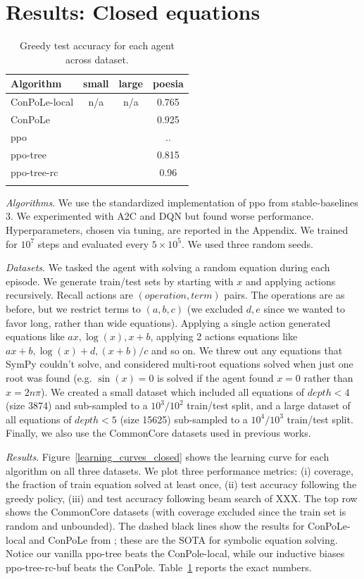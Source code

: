 \documentclass{article}
\theoremstyle{plain}
\theoremstyle{definition}
\theoremstyle{remark}
\begin{document}
\section{Results: Closed equations}
\begin{table}[t!]
\centering
\footnotesize
\caption{Greedy test accuracy for each agent across dataset.}
\begin{tabular}{l c c c}
\toprule
Algorithm & small & large & poesia \\
\midrule
ConPoLe-local     & n/a  & n/a  & 0.765  \\
ConPoLe          &  &  & 0.925  \\
ppo          &  &  & ..  \\
ppo-tree     &  &  & 0.815  \\
ppo-tree-rc  &  &  & 0.96  \\
\bottomrule
\label{tab:test_greedy}
\end{tabular}
\end{table}

\textit{Algorithms}. We use the standardized implementation of ppo from stable-baselines 3. We experimented with A2C and DQN but found worse performance. Hyperparameters, chosen via tuning, are reported in the Appendix. We trained for $10^7$ steps and evaluated every $5 \times 10^5$. We used three random seeds. 

\textit{Datasets}. We tasked the agent with solving a random equation during each episode. We generate train/test sets by starting with $x$ and applying actions recursively. Recall actions are $(operation, term)$ pairs. The operations are as before, but we restrict terms to $(a, b, c)$ (we excluded $d, e$ since we wanted to favor long, rather than wide equations). Applying a single action generated equations like $ax, \log(x), x+b$, applying 2 actions equations like $ax+b, \log(x)+d, (x+b)/c$ and so on. We threw out any equations that SymPy couldn't solve, and considered multi-root equations solved when just one root was found (e.g. $\sin(x) = 0$ is solved if the agent found $x=0$ rather than $x = 2 n \pi$). We created a small dataset which included all equations of $depth<4$ (size 3874) and sub-sampled to a $10^3/10^2$ train/test split, and a large dataset of all equations of $depth<5$ (size 15625) sub-sampled to a $10^4/10^3$ train/test split. Finally, we also use the CommonCore datasets used in previous works.

\textit{Results}. Figure~\ref{learning_curves_closed} shows the learning curve for each algorithm on all three datasets. We plot three performance metrics: (i) coverage, the fraction of train equation solved at least once, (ii) test accuracy following the greedy policy, (iii) and test accuracy following beam search of XXX.  The top row shows the CommonCore datasets (with coverage excluded since the train set is random and unbounded). The dashed black lines show the results for ConPoLe-local and ConPoLe from \cite{poesia2021contrastive}; these are the SOTA for symbolic equation solving. Notice our vanilla ppo-tree beats the ConPole-local, while our inductive biases ppo-tree-rc-buf beats the ConPole. Table~\ref{tab:test_greedy} reports the exact numbers. 
\end{document}
